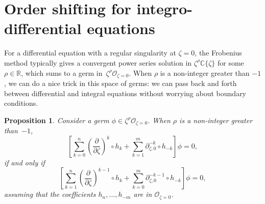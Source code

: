 \documentclass[10pt,a4paper]{amsart}
\newcommand{\R}{\mathbb{R}}
\newcommand{\C}{\mathbb{C}}
\newcommand{\fracderiv}[3]{\partial^{#1}_{#2, #3}}
\numberwithin{equation}{section}
\newtheorem{Proposition}[Theorem]{Proposition}
 { \theoremstyle{definition}
\newtheorem{Definition}[Theorem]{Definition}
\newtheorem{Remark}[Theorem]{Remark}
\newtheorem*{notation*}{Notation}
}
\begin{document}
\section{Order shifting for integro-differential equations}\label{shifting}
For a differential equation with a regular singularity at $\zeta = 0$, the Frobenius method typically gives a convergent power series solution in $\zeta^\rho \C\{\zeta\}$ for some $\rho \in \R$, which sums to a germ in~$\zeta^\rho \mathcal{O}_{\zeta=0}$. When $\rho$ is a non-integer greater than $-1$, we can do a nice trick in this space of germs: we can pass back and forth between differential and integral equations without worrying about boundary conditions.
\begin{Proposition}\label{prop:shifting}
Consider a germ $\phi \in \zeta^\rho \mathcal{O}_{\zeta=0}$. When $\rho$ is a non-integer greater than~$-1$,
\[ \left[ \sum_{k = 0}^n \left(\frac{\partial}{\partial \zeta}\right)^k \circ h_k + \sum_{k = 1}^m \fracderiv{-k}{\zeta}{0} \circ h_{-k} \right] \phi = 0, \]
if and only if
\[ \left[ \sum_{k = 1}^n \left(\frac{\partial}{\partial \zeta}\right)^{k-1} \circ h_k + \sum_{k = 0}^m \fracderiv{-k-1}{\zeta}{0} \circ h_{-k} \right] \phi = 0, \]
assuming that the coefficients $h_n, \dots, h_{-m}$ are in $\mathcal{O}_{\zeta=0}$.
\end{Proposition}
\end{document}
